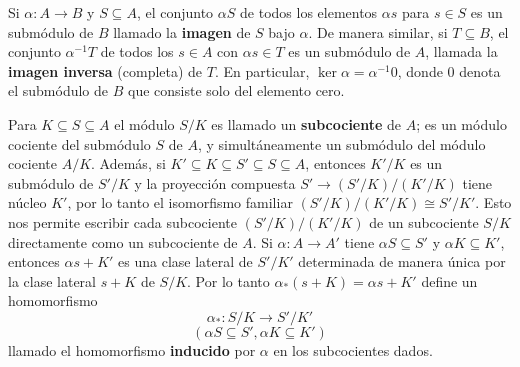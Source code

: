 %

Si \(\alpha: A \rightarrow B\) y \(S \subseteq A\), el conjunto \(\alpha S\) de todos los elementos \(\alpha s\) para \(s \in S\) es un submódulo de \(B\) llamado la \textbf{imagen} de \(S\) bajo \(\alpha\). De manera similar, si \(T \subseteq B\), el conjunto \(\alpha^{-1}T\) de todos los \(s \in A\) con \(\alpha s \in T\) es un submódulo de \(A\), llamada la \textbf{imagen inversa} (completa) de \(T\). En particular, \(\ker \alpha = \alpha^{-1}0\), donde \(0\) denota el submódulo de \(B\) que consiste solo del elemento cero.

Para \(K \subseteq S \subseteq A\) el módulo \(S/K\) es llamado un \textbf{subcociente} de \(A\); es un módulo cociente del submódulo \(S\) de \(A\), y simultáneamente un submódulo del módulo cociente \(A/K\). Además, si \(K' \subseteq K \subseteq S' \subseteq S \subseteq A\), entonces \(K'/K\) es un submódulo de \(S'/K\) y la proyección compuesta \(S' \rightarrow (S'/K)/(K'/K)\) tiene núcleo \(K'\), por lo tanto el isomorfismo familiar \((S'/K)/(K'/K) \cong S'/K'\). Esto nos permite escribir cada subcociente \((S'/K)/(K'/K)\) de un subcociente \(S/K\) directamente como un subcociente de \(A\). Si \( \alpha: A \rightarrow A'\) tiene \(\alpha S \subseteq S'\) y \(\alpha K \subseteq K'\), entonces \(\alpha s + K'\) es una clase lateral de \(S'/K'\) determinada de manera única por la clase lateral \(s+K\) de \(S/K\). Por lo tanto \(\alpha_{\ast}(s+K) = \alpha s + K'\) define un homomorfismo
\[\alpha_{\ast}: S/K \rightarrow S'/K'\]
\[(\alpha S \subseteq S', \alpha K \subseteq K')\]
llamado el homomorfismo \textbf{inducido} por \(\alpha\) en los subcocientes dados.

